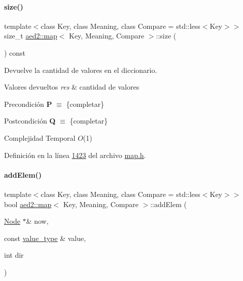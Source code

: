 \paragraph{\texorpdfstring{size()}{size()}}
{\footnotesize\ttfamily template$<$class Key, class Meaning, class Compare = std\+::less$<$\+Key$>$$>$ \\
size\+\_\+t \hyperlink{classaed2_1_1map}{aed2\+::map}$<$ Key, Meaning, Compare $>$\+::size (\begin{DoxyParamCaption}{ }\end{DoxyParamCaption}) const\hspace{0.3cm}{\ttfamily [inline]}}



Devuelve la cantidad de valores en el diccionario. 


\begin{DoxyRetVals}{Valores devueltos}
{\em res} & cantidad de valores\\
\hline
\end{DoxyRetVals}
\begin{DoxyPrecond}{Precondición}
{\bfseries P} $\equiv$ \{completar\} 
\end{DoxyPrecond}
\begin{DoxyPostcond}{Postcondición}
{\bfseries Q} $\equiv$ \{completar\}
\end{DoxyPostcond}

\begin{DoxyDescription}
\item[Complejidad Temporal]$O$(1)
\end{DoxyDescription}

Definición en la línea \hyperlink{map_8h_source_l01423}{1423} del archivo \hyperlink{map_8h_source}{map.\+h}.

\mbox{\label{classaed2_1_1map_a709e1a06ac3c5932c1eb6d9741f37b2c_a709e1a06ac3c5932c1eb6d9741f37b2c}} 
\paragraph{\texorpdfstring{add\+Elem()}{addElem()}}
{\footnotesize\ttfamily template$<$class Key, class Meaning, class Compare = std\+::less$<$\+Key$>$$>$ \\
bool \hyperlink{classaed2_1_1map}{aed2\+::map}$<$ Key, Meaning, Compare $>$\+::add\+Elem (\begin{DoxyParamCaption}\item[{\hyperlink{structaed2_1_1map_1_1Node}{Node} $\ast$\&}]{now,  }\item[{const \hyperlink{classaed2_1_1map_a719db98e0ff9a837610f76be33264680_a719db98e0ff9a837610f76be33264680}{value\+\_\+type} \&}]{value,  }\item[{int}]{dir }\end{DoxyParamCaption})\hspace{0.3cm}{\ttfamily [inline]}}



